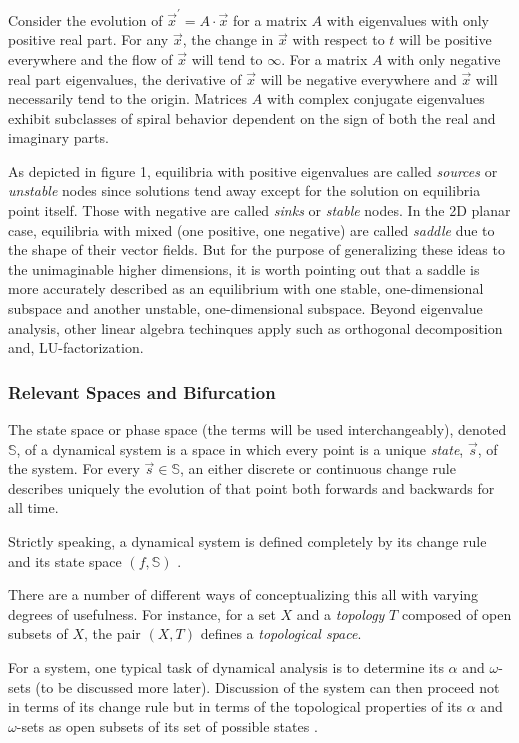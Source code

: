 \documentclass{elsart1p}
\begin{document}
Consider the evolution of $\vec{x}^{\prime} = A\cdot\vec{x}$ for a matrix $A$ 
with eigenvalues with only positive real part.  For any $\vec{x}$, the change 
in $\vec{x}$ with respect to $t$ will be positive everywhere
and the flow of $\vec{x}$ will tend to $\infty$.  For a matrix $A$ with 
only negative real part eigenvalues, the derivative of $\vec{x}$ will 
be negative everywhere and $\vec{x}$ will necessarily 
tend to the origin.  Matrices $A$ with complex conjugate eigenvalues exhibit 
subclasses of spiral behavior dependent on the sign of both the real 
and imaginary parts.

As depicted in figure 1,
equilibria with positive eigenvalues are called \textit{sources} 
or \textit{unstable} nodes since solutions tend away except for 
    the solution on equilibria point itself.  Those with negative 
    are called \textit{sinks} or \textit{stable} nodes.  In the 2D 
    planar case, equilibria with mixed (one positive, one negative) 
    are called \textit{saddle} due to the shape of their vector fields.  
    But for
the purpose of generalizing these ideas to the unimaginable higher dimensions,
it is worth pointing out that a saddle is more accurately described
as an equilibrium with one stable, one-dimensional subspace and another 
unstable, one-dimensional subspace.  Beyond eigenvalue analysis, other
linear algebra techinques apply such as orthogonal decomposition and,
LU-factorization.

\subsubsection{Relevant Spaces and Bifurcation}
The state space or phase space (the terms will be used interchangeably), 
denoted $\mathbb{S}$, of a dynamical system is a space in which 
every point is a unique \textit{state}, $\vec{s}$, of the system.  For every
$\vec{s} \in \mathbb{S}$, an either discrete or continuous change rule describes
uniquely the evolution of that point both forwards and backwards for all time.

Strictly speaking, a dynamical system is defined completely by its 
change rule and its state space $(f, \mathbb{S})$ \cite{hirsch}.  

There are a number of different ways of conceptualizing this all with varying
degrees of usefulness.  For instance, for a set $X$ and a \textit{topology} 
$T$ composed of
open subsets of $X$, the pair $(X,T)$ defines a \textit{topological space}.

For a system, one typical task of dynamical analysis is to determine its
$\alpha$ and $\omega$-sets (to be discussed more later).  Discussion of the
system can then proceed not in terms of its change rule but in terms of the topological properties of its 
$\alpha$ and $\omega$-sets as open subsets of its set of possible states 
\cite{basener}.
\end{document}

